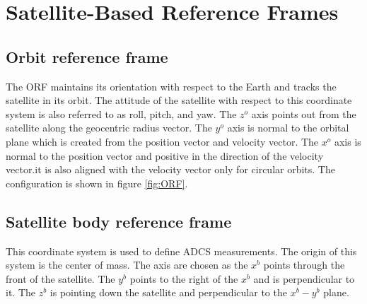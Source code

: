 \section{Satellite-Based Reference Frames}
\subsection{Orbit reference frame}
The ORF maintains its orientation with respect to the Earth and tracks the satellite in its orbit. The attitude of the satellite with respect to this coordinate system is also referred to as roll, pitch, and yaw. The $z^o$ axis points out from the satellite along the geocentric radius vector. The $y^o$ axis is normal to the orbital plane which is created from the position vector and velocity vector. The $x^o$ axis is normal to the position vector and positive in the direction of the velocity vector.it is also aligned with the velocity vector only for circular orbits. The configuration is shown in figure \ref{fig:ORF}.

\subsection{Satellite body reference frame}
This coordinate system is used to define ADCS measurements. The origin of this system is the center of mass. The axis are chosen as the $x^b$ points through the front of the satellite. The $y^b$ points to the right of the $x^b$ and is perpendicular to it. The $z^b$ is pointing down the satellite and perpendicular to the $x^b - y^b $ plane.




\clearpage